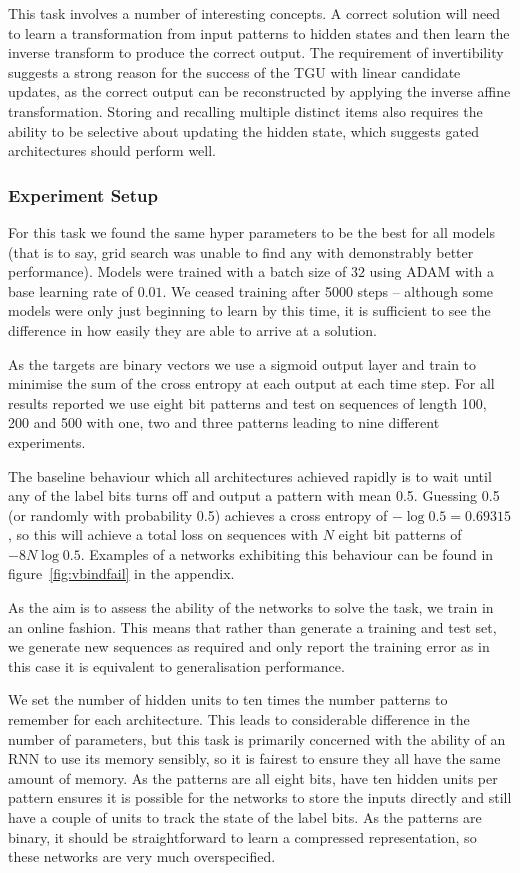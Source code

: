 This task involves a number of interesting concepts. A correct solution will need to learn a
transformation from input patterns to hidden states and then learn the inverse transform
to produce the correct output. The requirement of invertibility suggests a strong reason
for the success of the TGU with linear candidate updates, as the correct output can be reconstructed
by applying the inverse affine transformation. Storing and recalling multiple distinct items also 
requires the ability to be selective about updating the hidden state, which suggests gated architectures
should perform well.

\subsubsection{Experiment Setup}
For this task we found the same hyper parameters to be the best for all models
(that is to say, grid search was unable to find any with demonstrably better performance).
Models were trained with a batch size of \(32\) using ADAM with a base learning rate of \(0.01\).
We ceased training after 5000 steps --  although some models were only just beginning to learn
by this time, it is sufficient to see the difference in how easily they are able to arrive
at a solution.

As the targets are binary vectors we use a sigmoid output layer and train to minimise the
sum of the cross entropy at each output at each time step.
For all results reported we use eight bit patterns and test on sequences of length 100, 200 and 500
with one, two and three patterns leading to nine different experiments.

The baseline behaviour which all architectures achieved rapidly
is to wait until any of the label bits turns off and output a pattern with mean 0.5. Guessing
0.5 (or randomly with probability 0.5) achieves a cross entropy of \(-\log 0.5 = 0.69315\), so
this will achieve a total loss on sequences with \(N\) eight bit patterns of \(-8N\log 0.5\).
Examples of a networks exhibiting this behaviour can be found in figure~\ref{fig:vbindfail}
in the appendix.

As the aim is to assess the ability of the networks to solve the task, we train in an online
fashion. This means that rather than generate a training and test set, we generate new sequences
as required and only report the training error as in this case it is equivalent to generalisation
performance.

We set the number of hidden units to ten times the number patterns to remember for each architecture.
This leads to considerable difference in the number of parameters, but this task is primarily
concerned with the ability of an RNN to use its memory sensibly, so it is fairest to ensure they
all have the same amount of memory. As the patterns are all eight bits, have ten hidden units
per pattern ensures it is possible for the networks to store the inputs directly and still have
a couple of units to track the state of the label bits. As the patterns are binary, it should be
straightforward to learn a compressed representation, so these networks are very much overspecified.


